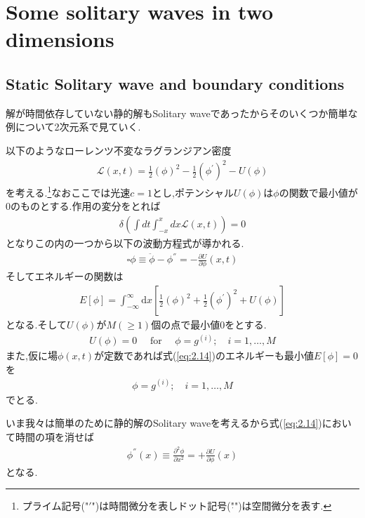 \documentclass[dvipdfmx,11pt,a4paper]{jsbook}
\begin{document}
\section{Some solitary waves in two dimensions}
\subsection{Static Solitary wave and boundary conditions}
解が時間依存していない静的解もSolitary waveであったからそのいくつか簡単な例について2次元系で見ていく.

以下のようなローレンツ不変なラグランジアン密度
\begin{align}
    \mathscr{L}(x, t)=\frac{1}{2}(\phi)^{2}-\frac{1}{2}\left(\phi^{'}\right)^{2}-U(\phi)
\end{align}
を考える.\footnote{プライム記号("$'$")は時間微分を表しドット記号("$\dot{ }$")は空間微分を表す.}なおここでは光速$c=1$とし,ポテンシャル$U(\phi)$は$\phi$の関数で最小値が0のものとする.作用の変分をとれば
\begin{align}
    \delta\left(\int dt \int_{-x}^{x}dx\mathscr{L}(x,t)\right)=0
\end{align}
となりこの内の一つから以下の波動方程式が導かれる.
\begin{align}
    \square \phi \equiv \ddot{\phi}-\phi^{''}=-\frac{\partial U}{\partial \phi}(x, t)\label{eq:2.13}
\end{align}
そしてエネルギーの関数は
\begin{align}
    E[\phi]=\int_{-\infty}^{\infty} \mathrm{d} x\left[\frac{1}{2}(\phi)^{2}+\frac{1}{2}\left(\phi^{'}\right)^{2}+U(\phi)\right]\label{eq:2.14}
\end{align}
となる.そして$U(\phi)$が$M(\geq1)$個の点で最小値0をとする.
\begin{align}
    U(\phi)=0 \quad \text { for } \quad \phi=g^{(i)} ; \quad i=1, \ldots, M\label{eq:2.15}
\end{align}
また,仮に場$\phi(x,t)$が定数であれば式(\ref{eq:2.14})のエネルギーも最小値$E[\phi]=0$を
\begin{align}
    \phi=g^{(i)} ; \quad i=1, \ldots, M
\end{align}
でとる.

いま我々は簡単のために静的解のSolitary waveを考えるから式(\ref{eq:2.14})において時間の項を消せば
\begin{align}
    \phi^{''}(x) \equiv \frac{\partial^{2} \phi}{\partial x^{2}}=+\frac{\partial U}{\partial \phi}(x)\label{eq:2.17}
\end{align}
となる.
\end{document}
